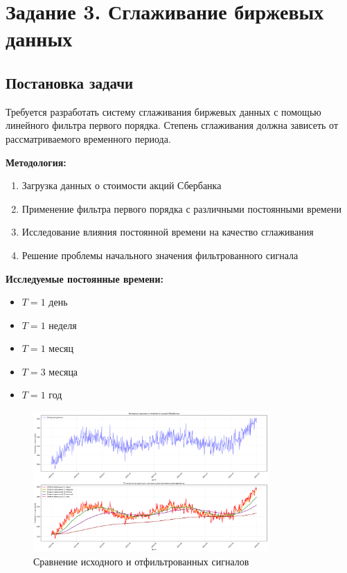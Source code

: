 \section*{Задание 3. Сглаживание биржевых данных}

\subsection*{Постановка задачи}

Требуется разработать систему сглаживания биржевых данных с помощью линейного фильтра первого порядка. Степень сглаживания должна зависеть от рассматриваемого временного периода.

\textbf{Методология:}
\begin{enumerate}
    \item Загрузка данных о стоимости акций Сбербанка
    \item Применение фильтра первого порядка с различными постоянными времени
    \item Исследование влияния постоянной времени на качество сглаживания
    \item Решение проблемы начального значения фильтрованного сигнала
\end{enumerate}

\textbf{Исследуемые постоянные времени:}
\begin{itemize}
    \item $T = 1$ день
    \item $T = 1$ неделя
    \item $T = 1$ месяц
    \item $T = 3$ месяца
    \item $T = 1$ год
\end{itemize}

\begin{figure}[H]
    \centering
    \includegraphics[width=0.8\textwidth]{images/task3/stock_data_smoothing_comparison.png}
    \caption{Сравнение исходного и отфильтрованных сигналов}
    \label{fig:stock_smoothing_comparison}
\end{figure}

